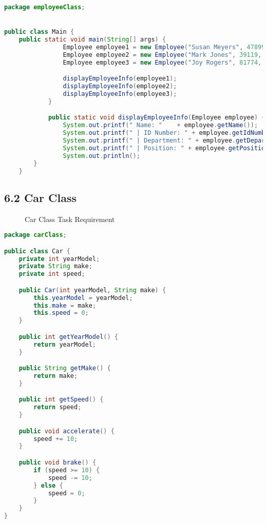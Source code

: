 \documentclass{article}
\begin{document}
\begin{lstlisting}[language=Java, caption=Main.java]
package employeeClass;


public class Main {
    public static void main(String[] args) {
                Employee employee1 = new Employee("Susan Meyers", 47899, "Accounting", "Vice President");
                Employee employee2 = new Employee("Mark Jones", 39119, "IT", "Programmer");
                Employee employee3 = new Employee("Joy Rogers", 81774, "Manufacturing", "Engineer");

                displayEmployeeInfo(employee1);
                displayEmployeeInfo(employee2);
                displayEmployeeInfo(employee3);
            }

            public static void displayEmployeeInfo(Employee employee) {
                System.out.printf(" Name: "    + employee.getName());
                System.out.printf(" | ID Number: " + employee.getIdNumber());
                System.out.printf(" | Department: " + employee.getDepartment());
                System.out.printf(" | Position: " + employee.getPosition());
                System.out.println();
        }
    }
\end{lstlisting}

\subsection*{6.2 Car Class}

\begin{figure}[h]
    \centering
    \caption{Car Class Task Requirement}
\end{figure}

\begin{lstlisting}[language=Java, caption=Car.java]
package carClass;

public class Car {
    private int yearModel;
    private String make;
    private int speed;

    public Car(int yearModel, String make) {
        this.yearModel = yearModel;
        this.make = make;
        this.speed = 0;
    }

    public int getYearModel() {
        return yearModel;
    }

    public String getMake() {
        return make;
    }

    public int getSpeed() {
        return speed;
    }

    public void accelerate() {
        speed += 10;
    }

    public void brake() {
        if (speed >= 10) {
            speed -= 10;
        } else {
            speed = 0;
        }
    }
}

\end{lstlisting}
\end{document}
